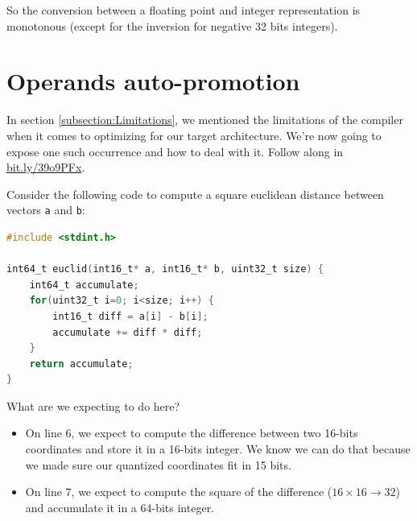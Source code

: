 So the conversion between a floating point and integer representation is monotonous (except for the inversion for negative 32 bits integers).

\section{Operands auto-promotion}
\label{annex:promotion}

In section \ref{subsection:Limitations}, we mentioned the limitations of the compiler when it comes to optimizing for our target architecture. We're now going to expose one such occurrence and how to deal with it. Follow along in \href{https://dpu.dev/#z:OYLghAFBqd5TKALEBjA9gEwKYFFMCWALugE4A0BIEAViAIzkA2AhgHagD63q5AzugCupVNhAByAKQAmAMwE2qJoJwBqSbIDCfIoTZEAdEg25JABgCC5iwqIA2ACyciq7IKUFMEW/TvOAVKos5Ko%2BfkSBAEYhgray0s6qfAQAXtgAlOoA7ABC1qoFofqOiSyoqIIAtoKsRNgaeZaFqgBmZBCx%2BvGJBBoAImYNoRraqfWyOcPSedOZkrn5zYVhiYQtLeqyfUGSAKw5vbvbALSqkXsHe30Ni0tB5VU1LHXq0/2qaxuBnzdNhfPXP4FUjYIjCNj3CrVWrjRpWLKAizidLMCS7cTkNgSMwY9ASTRJIQibCvWT0DFEbHIlEAaxAuzMqPEDgxlXpjKx4hx5Dx4gxfBAjMpXOR5DgsBQGBw%2BGIZEo1Do0mY7C4PH4RNEEhk8kUyjUIx0ekMxlkpks1lsJRcbg8XhWESCIXtURicQSLmSaTmCyBRXsThcZShTzqvwszTapA6bp6/UGE2GWk9sKmMxy3rhdwKADd0LUCEwSfaPgR1pttiwLocTmcq1cw1nIY8Ya88lsS2XvqWWg3/gjbqoQWDSBCg83nrDrADrKKmGiMZzubyCQJhKJSdIKVT0iikNgWDhSNQUXPmaz2ZiqTyJPzBeRhTid%2BQ6QymbIF1feVuRSjxQh4BAkroJUAAOBbYBQVAQBgoHgUeSgqsc0hmMhxyyOQLQFnUpAChAkRXpECgsKQACeEjkuQMGVNg%2BgAPJsEwZEiuQOCVCqhZXoQIKoEQBDZtgArMdgAAe2AVHU5EYrY2CntyTAEJEpDESRmhYGI4gUUQpAEGyGmziqIDcJwvDyZEAqQCi6Agbx6BsIJ/IamI9AnvOl7MbyCEcKo9BmK0ZCqH0AAKACqqgQCCTCqMhyEGLIBhmJkEAyiQpCkowqiqbBhapdqzkZd%2Bj60hep4suQbKvouuI3vwd4PqKf6AWgwFgdl8rQc1cFoKwHBIShZhoRhWEQbh%2BHMYRbDKZJlHAdRdEMUx3Ksex6mLQQ3G8fxgnciJYmCBJemUPoMlXqZSmkapOBTVpOmSSeBlGSZCnmRAlnWQQtn2eqa5iNILniOiblLhInnAN5vmRgFIVhRFUV9bF8WJcl/nakqGUddlG6ZJoBXUuQe4HhBx5MqV5Ucp%2B1UCkK25Fa%2Bp7voDVV8ve1NMpuDPXkzdVPvxOHvViDhAA}{bit.ly/39o9PFx}.

Consider the following code to compute a square euclidean distance between vectors \verb|a| and \verb|b|:
\begin{lstlisting}[language=C]
#include <stdint.h>

int64_t euclid(int16_t* a, int16_t* b, uint32_t size) {
    int64_t accumulate;
    for(uint32_t i=0; i<size; i++) {
        int16_t diff = a[i] - b[i];
        accumulate += diff * diff;
    }
    return accumulate;
}
\end{lstlisting}

What are we expecting to do here?
\begin{itemize}
    \item On line 6, we expect to compute the difference between two 16-bits coordinates and store it in a 16-bits integer. We know we can do that because we made sure our quantized coordinates fit in 15 bits.
    \item On line 7, we expect to compute the square of the difference ($16 \times 16 \to 32$) and accumulate it in a 64-bits integer.
\end{itemize}


